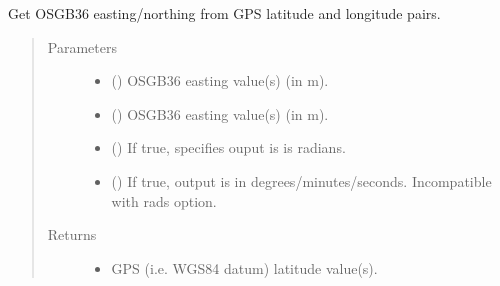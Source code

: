 \documentclass[letterpaper,10pt,english]{sphinxmanual}
\begin{document}
\begin{fulllineitems}
\label{\detokenize{index:flood_tool.get_gps_lat_long_from_easting_northing}}
\sphinxAtStartPar
Get OSGB36 easting/northing from GPS latitude and
longitude pairs.
\begin{quote}\begin{description}
\item[{Parameters}] \leavevmode\begin{itemize}
\item {} 
\sphinxAtStartPar
{} () \textendash{} OSGB36 easting value(s) (in m).

\item {} 
\sphinxAtStartPar
{} () \textendash{} OSGB36 easting value(s) (in m).

\item {} 
\sphinxAtStartPar
{} (\sphinxstyleliteralemphasis{\sphinxupquote{ (}}\sphinxstyleliteralemphasis{\sphinxupquote{)}}) \textendash{} If true, specifies ouput is is radians.

\item {} 
\sphinxAtStartPar
{} (\sphinxstyleliteralemphasis{\sphinxupquote{ (}}\sphinxstyleliteralemphasis{\sphinxupquote{)}}) \textendash{} If true, output is in degrees/minutes/seconds. Incompatible
with rads option.

\end{itemize}

\item[{Returns}] \leavevmode
\sphinxAtStartPar
\begin{itemize}
\item {} 
\sphinxAtStartPar
{} \textendash{} GPS (i.e. WGS84 datum) latitude value(s).


\end{itemize}
\end{description}
\end{quote}
\end{fulllineitems}
\end{document}
